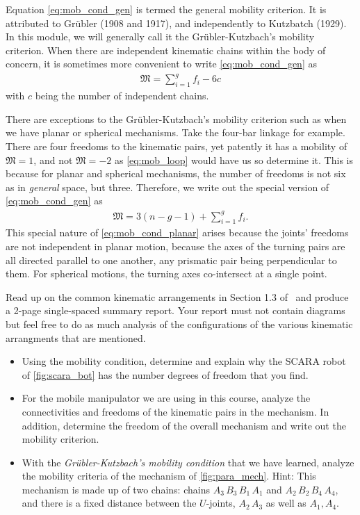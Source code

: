 Equation \eqref{eq:mob_cond_gen} is termed the general mobility criterion. It is attributed to Gr\"ubler (1908 and 1917), and independently to Kutzbatch (1929). In this module, we will generally call it the Gr\"ubler-Kutzbach's mobility criterion. When there are independent kinematic chains within the body of concern, it is sometimes more convenient to write \eqref{eq:mob_cond_gen} as 
%
\begin{align}
	\mathfrak{M} = \sum_{i=1}^g f_i - 6c
	\label{eq:mob_loop}
\end{align}
%
with $c$ being the number of independent chains. 

There are exceptions to the Gr\"ubler-Kutzbach's mobility criterion such as when we have planar or spherical mechanisms. Take the four-bar linkage for example. There are four freedoms to the kinematic pairs, yet patently it has a mobility of $\mathfrak{M}=1$, and not $\mathfrak{M}=-2$ as \eqref{eq:mob_loop} would have us so determine it.  This is because for planar and spherical mechanisms, the number of freedoms is not six as in \textit{general} space, but three. Therefore, we write out the special version of \eqref{eq:mob_cond_gen} as 
%
\begin{align}
\mathfrak{M} = 3(n - g - 1) + \sum_{i=1}^{g} f_i.
\label{eq:mob_cond_planar}
\end{align}
%
This special nature of \eqref{eq:mob_cond_planar} arises because the joints' freedoms are not independent in planar motion, because the axes of the turning pairs are all directed parallel to one another, any prismatic pair being perpendicular to them. For spherical motions, the turning axes co-intersect at a single point.

\begin{homework}
	Read up on the common kinematic arrangements in Section 1.3 of~\cite{SpongBook} and produce a 2-page single-spaced summary report. Your report must not contain diagrams but feel free to do as much analysis of the configurations of the various kinematic arrangments that are mentioned. \newline
	\begin{itemize}
		\item Using the mobility condition, determine and explain why the SCARA robot of \autoref{fig:scara_bot} has the number degrees of freedom that you find.
		\item For the mobile manipulator we are using in this course, analyze the connectivities and freedoms of the kinematic pairs in the mechanism. In addition, determine the freedom of the overall mechanism and write out the mobility criterion.
		\item With the \textit{{Gr\"ubler-Kutzbach's} mobility condition} that we have learned, analyze the mobility criteria of the mechanism of \autoref{fig:para_mech}. Hint: This mechanism is made up of two chains: chains $A_3\, B_3\, B_1\, A_1$ and $A_2\, B_2\, B_4\, A_4$, and there is a fixed distance between the $U$-joints, $A_2\, A_3$ as well as $A_1, A_4$.
	\end{itemize}
\end{homework}


